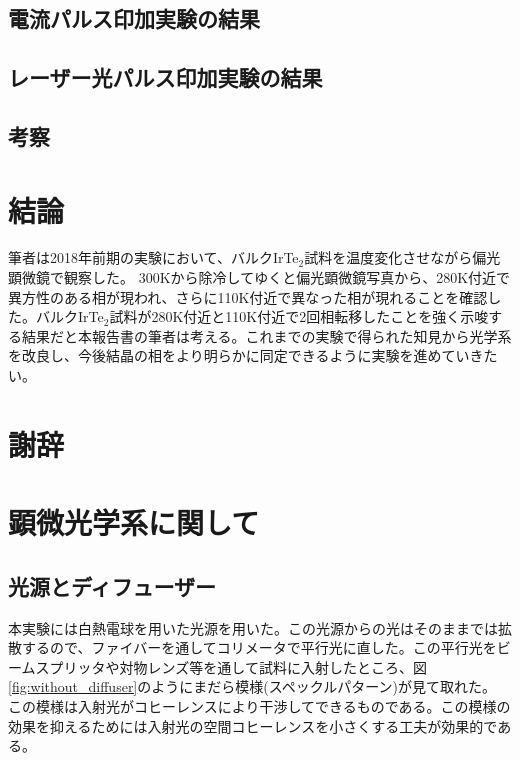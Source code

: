 \documentclass[11pt,a4paper]{jsarticle}
\begin{document}
\subsection{電流パルス印加実験の結果}
\subsection{レーザー光パルス印加実験の結果}
\subsection{考察}

\section{結論}
筆者は2018年前期の実験において、バルクIrTe$_2$試料を温度変化させながら偏光顕微鏡で観察した。
300Kから除冷してゆくと偏光顕微鏡写真から、280K付近で異方性のある相が現われ、さらに110K付近で異なった相が現れることを確認した。バルクIrTe$_2$試料が280K付近と110K付近で2回相転移したことを強く示唆する結果だと本報告書の筆者は考える。これまでの実験で得られた知見から光学系を改良し、今後結晶の相をより明らかに同定できるように実験を進めていきたい。


\section*{謝辞}

\newpage
\appendix
\section{顕微光学系に関して}
\subsection{光源とディフューザー}
本実験には白熱電球を用いた光源を用いた。この光源からの光はそのままでは拡散するので、ファイバーを通してコリメータで平行光に直した。この平行光をビームスプリッタや対物レンズ等を通して試料に入射したところ、図\ref{fig:without_diffuser}のようにまだら模様(スペックルパターン)が見て取れた。
この模様は入射光がコヒーレンスにより干渉してできるものである。この模様の効果を抑えるためには入射光の空間コヒーレンスを小さくする工夫が効果的である。
\end{document}
